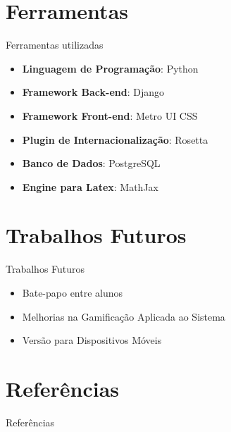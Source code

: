 \documentclass[10pt]{beamer}
\begin{document}
\section{Ferramentas}

\begin{frame}{Ferramentas utilizadas}

\begin{itemize}
	\item \textbf{Linguagem de Programa\c{c}\~ao}: Python
	\item \textbf{Framework Back-end}: Django
	\item \textbf{Framework Front-end}: Metro UI CSS
	\item \textbf{Plugin de Internacionaliza\c{c}\~ao}: Rosetta
	\item \textbf{Banco de Dados}: PostgreSQL
	\item \textbf{Engine para Latex}: MathJax
\end{itemize}

\end{frame}

\section{Trabalhos Futuros}

\begin{frame}{Trabalhos Futuros}

\begin{itemize}
	\item Bate-papo entre alunos
	\item Melhorias na Gamifica\c{c}\~ao Aplicada ao Sistema
	\item Vers\~ao para Dispositivos M\'oveis
\end{itemize}

\end{frame}

\section{Refer\^encias}
\begin{frame}[allowframebreaks]{Refer\^encias}
  
\end{frame}
\end{document}
